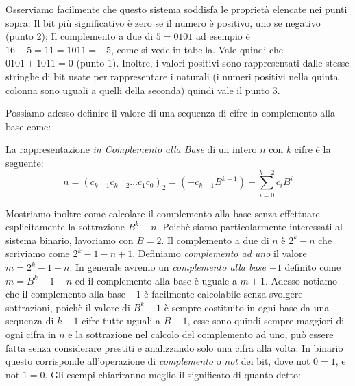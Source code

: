 Osserviamo facilmente che questo sistema soddisfa le proprietà elencate nei
punti sopra: Il bit più significativo è zero se il numero è
positivo, uno se negativo (punto 2); Il complemento a due di $5 = 0101$ ad
esempio è $16-5 = 11 = 1011 = -5$, come si vede in tabella. Vale quindi che
$0101+1011 = 0$ (punto $1$). Inoltre, i valori positivi sono rappresentati dalle stesse stringhe di bit usate per rappresentare i naturali (i numeri positivi nella quinta colonna sono uguali a quelli della seconda)
quindi vale il punto $3$.

Possiamo adesso definire il valore di una sequenza di cifre in complemento alla base come:

\begin{defn}
La rappresentazione \emph{in Complemento alla Base} di un intero $n$ 
con $k$ cifre è la seguente:
	\[ n = (c_{k-1}c_{k-2}{\ldots}c_1c_0)_2 = (-c_{k-1}B^{k-1}) + \sum_{i=0}^{k-2}c_iB^i \]
\end{defn}

Mostriamo inoltre come calcolare il complemento alla base senza effettuare
esplicitamente la sottrazione $B^k - n$. Poichè siamo particolarmente
interessati al sistema binario, lavoriamo con $B=2$.  
Il complemento a due di $n$ è $2^k - n$ che scriviamo come $2^k-1-n+1$. Definiamo \emph{complemento ad uno} il valore $m = 2^k-1-n$. In generale avremo un \emph{complemento alla base $-1$} definito come $m = B^k-1-n$ ed il complemento alla base è uguale a $m+1$. 
Adesso notiamo che il complemento alla base $-1$ è facilmente calcolabile
senza svolgere sottrazioni, poichè il valore di $B^k-1$ è sempre costituito in ogni base da una sequenza di $k-1$ cifre tutte uguali a $B-1$, esse sono quindi sempre maggiori di ogni cifra in $n$ e la sottrazione nel calcolo del complemento ad uno, può essere fatta senza considerare prestiti e analizzando solo una cifra alla volta. In binario questo corrisponde all'operazione di \emph{complemento} o \emph{not} dei bit, dove \textsf{not} $0 = 1$, e \textsf{not} $1 = 0$. Gli
esempi chiariranno meglio il significato di quanto detto:

